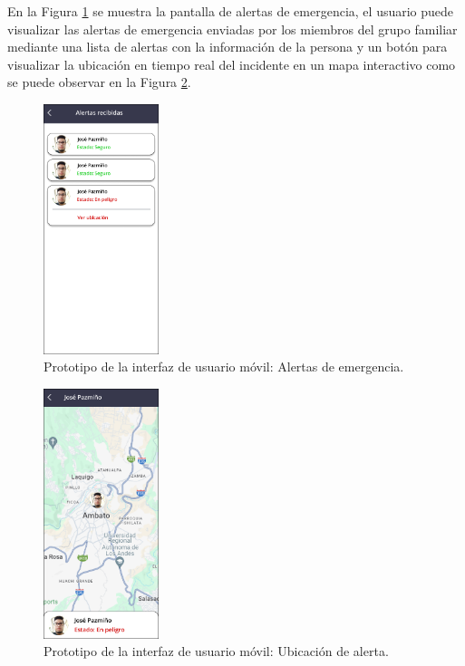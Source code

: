 En la Figura  \ref{fig:prototipo-alertas-mobile} se muestra la pantalla de alertas de emergencia, el usuario puede visualizar las alertas de emergencia
enviadas por los miembros del grupo familiar mediante una lista de alertas con la información de la persona y un botón para visualizar la ubicación
en tiempo real del incidente en un mapa interactivo como se puede observar en la Figura \ref{fig:prototipo-ubicacion-alerta-mobile}.

\begin{figure}[H]
    \centering
    \includegraphics[width=0.3\textwidth]{chapters/III-resultados-y-discusion/resources/images/prototipo-alertas-mobile.png}
    \caption{Prototipo de la interfaz de usuario móvil: Alertas de emergencia.}
    \label{fig:prototipo-alertas-mobile}
\end{figure}

\begin{figure}[H]
    \centering
    \includegraphics[width=0.3\textwidth]{chapters/III-resultados-y-discusion/resources/images/prototipo-ubicacion-alerta-mobile.png}
    \caption{Prototipo de la interfaz de usuario móvil: Ubicación de alerta.}
    \label{fig:prototipo-ubicacion-alerta-mobile}
\end{figure}

